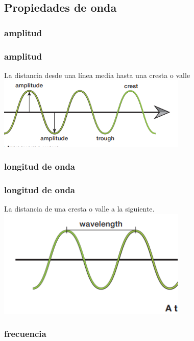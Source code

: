 \documentclass{beamer}
\begin{document}
\subsection{Propiedades de onda}

\subsubsection{amplitud}

\begin{frame}
    \frametitle{amplitud}
    
\pause La distancia desde una línea media hasta una cresta o valle
    \includegraphics[width=9cm]{../../../../public/amplitude.png}
\end{frame}

\subsubsection{longitud de onda}

\begin{frame}
    \frametitle{longitud de onda}
    \pause La distancia de una cresta o valle a la siguiente.
    \includegraphics[width=9cm]{../../../../public/wavelength.png}
\end{frame}

\subsubsection{frecuencia}
\end{document}
